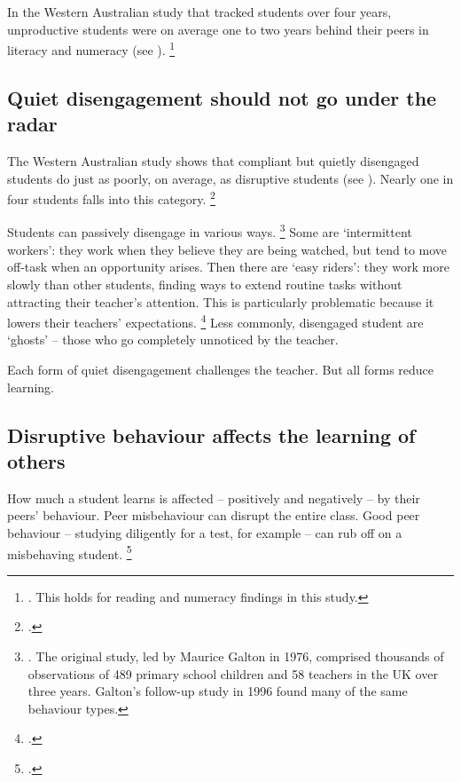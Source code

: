 \documentclass[FrontPage]{grattan}
\begin{document}
In the Western Australian study that tracked students over four years, unproductive students were on average one to two years behind their peers in literacy and numeracy (see 
).%
    \footnote{\textcite{Angus2009PipelineProject}. This holds for reading and numeracy findings in this study.}


\subsection{Quiet disengagement should not go under the radar}\label{subsec:quiet-disengagement-under-radar}
The Western Australian study shows that compliant but quietly disengaged students do just as poorly, on average, as disruptive students (see ). Nearly one in four students falls into this category.%
    \footcite{Angus2009PipelineProject}  

Students can passively disengage in various ways.%
    \footnote{\textcite{Galton1999ChangesPatternsTeacher}.
    The original study, led by Maurice Galton in 1976, comprised thousands of observations of 489 primary school children and 58 teachers in the UK over three years.
    Galton's follow-up study in 1996 found many of the same behaviour types.}
Some are `intermittent workers': they work when they believe they are being watched, but tend to move off-task when an opportunity arises. Then there are `easy riders': they work more slowly than other students, finding ways to extend routine tasks without attracting their teacher's attention. This is particularly problematic because it lowers their teachers' expectations.%
    \footcites{Angus2009PipelineProject}{Galton1999ChangesPatternsTeacher} 
Less commonly, disengaged student are `ghosts' -- those who go completely unnoticed by the teacher.

Each form of quiet disengagement challenges the teacher. But all forms reduce learning. 

\subsection{Disruptive behaviour affects the learning of others}\label{subsec:disruptive-behaviour-affects-learning-others}
How much a student learns is affected -- positively and negatively -- by their peers' behaviour.
Peer misbehaviour can disrupt the entire class. Good peer behaviour -- studying diligently for a test, for example -- can rub off on a misbehaving student.%
\footcites{Carrell2016LongRunEffectsDisruptive}{McVicar2013RightPeerRight} 
\end{document}
